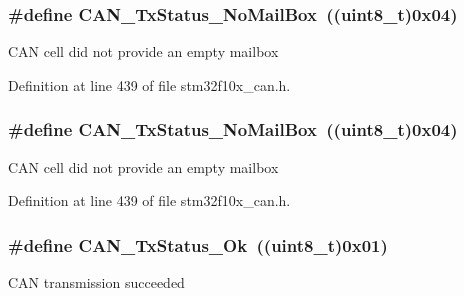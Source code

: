 \subsubsection[{\texorpdfstring{C\+A\+N\+\_\+\+Tx\+Status\+\_\+\+No\+Mail\+Box}{CAN_TxStatus_NoMailBox}}]{\setlength{\rightskip}{0pt plus 5cm}\#define C\+A\+N\+\_\+\+Tx\+Status\+\_\+\+No\+Mail\+Box~(({\bf uint8\+\_\+t})0x04)}\hypertarget{group___c_a_n__transmit__constants_ga2620e99debd51011d3569121f2e44690}{}\label{group___c_a_n__transmit__constants_ga2620e99debd51011d3569121f2e44690}
C\+AN cell did not provide an empty mailbox 

Definition at line 439 of file stm32f10x\+\_\+can.\+h.

\subsubsection[{\texorpdfstring{C\+A\+N\+\_\+\+Tx\+Status\+\_\+\+No\+Mail\+Box}{CAN_TxStatus_NoMailBox}}]{\setlength{\rightskip}{0pt plus 5cm}\#define C\+A\+N\+\_\+\+Tx\+Status\+\_\+\+No\+Mail\+Box~(({\bf uint8\+\_\+t})0x04)}\hypertarget{group___c_a_n__transmit__constants_ga2620e99debd51011d3569121f2e44690}{}\label{group___c_a_n__transmit__constants_ga2620e99debd51011d3569121f2e44690}
C\+AN cell did not provide an empty mailbox 

Definition at line 439 of file stm32f10x\+\_\+can.\+h.

\subsubsection[{\texorpdfstring{C\+A\+N\+\_\+\+Tx\+Status\+\_\+\+Ok}{CAN_TxStatus_Ok}}]{\setlength{\rightskip}{0pt plus 5cm}\#define C\+A\+N\+\_\+\+Tx\+Status\+\_\+\+Ok~(({\bf uint8\+\_\+t})0x01)}\hypertarget{group___c_a_n__transmit__constants_ga0b401c61922b1449de9b486dcf475c97}{}\label{group___c_a_n__transmit__constants_ga0b401c61922b1449de9b486dcf475c97}
C\+AN transmission succeeded 

